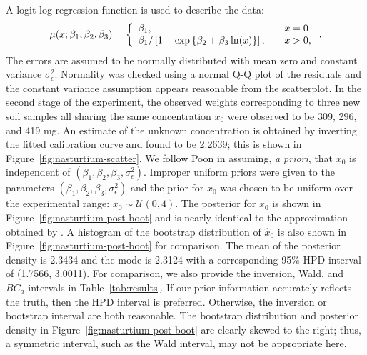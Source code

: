 \documentclass[cmfont,usenames,dvipsnames,leqno]{afit-etd}\usepackage[]{graphicx}\usepackage[]{color}
\newcommand{\mc}[1]{\ensuremath{\mathcal{#1}}}
\newcommand{\wh}[1]{\ensuremath{\widehat{#1}}}
\begin{document}
A logit-log regression function is used to describe the data:
\begin{equation*}
  \mu(x; \beta_1, \beta_2, \beta_3) = \left\{ \begin{array}{l l}
                                              \beta_1, &\quad x = 0 \\
                                              \beta_1 / \left[1 + \exp\left\{\beta_2 + \beta_3\ln(x)\right\}\right], &\quad x > 0,
                                            \end{array} \right..
\end{equation*}
The errors are assumed to be normally distributed with mean zero and constant variance $\sigma_\epsilon^2$. Normality was checked using a normal Q-Q plot of the residuals and the constant variance assumption appears reasonable from the scatterplot. In the second stage of the experiment, the observed weights corresponding to three new soil samples all sharing the same concentration $x_0$ were observed to be 309, 296, and 419 mg. An estimate of the unknown concentration is obtained by inverting the fitted calibration curve and found to be 2.2639; this is shown in Figure~\ref{fig:nasturtium-scatter}. We follow Poon in assuming, \textit{a priori}, that $x_0$ is independent of $(\beta_1, \beta_2, \beta_3, \sigma_\epsilon^2)$. Improper uniform priors were given to the parameters $(\beta_1, \beta_2, \beta_3, \sigma_\epsilon^2)$ and the prior for $x_0$ was chosen to be uniform over the experimental range: $x_0 \sim \mc{U}(0, 4)$. The posterior for $x_0$ is shown in Figure~\ref{fig:nasturtium-post-boot} and is nearly identical to the approximation obtained by \citet[fig. 9]{racine-poon_bayesian_1988}. A histogram of the bootstrap distribution of $\wh{x}_0$ is also shown in Figure~\ref{fig:nasturtium-post-boot} for comparison. The mean of the posterior  density is 2.3434 and the mode is 2.3124 with a corresponding 95\% HPD interval of (1.7566, 3.0011). For comparison, we also provide the inversion, Wald, and $BC_a$ intervals in Table~\ref{tab:results}. If our prior information accurately reflects the truth, then the HPD interval is preferred. Otherwise, the inversion or bootstrap interval are both reasonable. The bootstrap distribution and posterior density in Figure~\ref{fig:nasturtium-post-boot} are clearly skewed to the right; thus, a symmetric interval, such as the Wald interval, may not be appropriate here.
\end{document}

